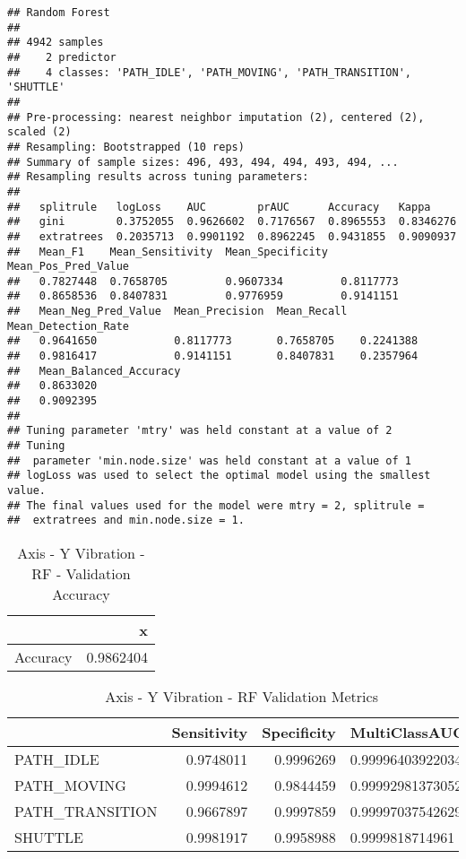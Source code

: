 \documentclass[]{article}
\begin{document}
\begin{verbatim}
## Random Forest 
## 
## 4942 samples
##    2 predictor
##    4 classes: 'PATH_IDLE', 'PATH_MOVING', 'PATH_TRANSITION', 'SHUTTLE' 
## 
## Pre-processing: nearest neighbor imputation (2), centered (2), scaled (2) 
## Resampling: Bootstrapped (10 reps) 
## Summary of sample sizes: 496, 493, 494, 494, 493, 494, ... 
## Resampling results across tuning parameters:
## 
##   splitrule   logLoss    AUC        prAUC      Accuracy   Kappa    
##   gini        0.3752055  0.9626602  0.7176567  0.8965553  0.8346276
##   extratrees  0.2035713  0.9901192  0.8962245  0.9431855  0.9090937
##   Mean_F1    Mean_Sensitivity  Mean_Specificity  Mean_Pos_Pred_Value
##   0.7827448  0.7658705         0.9607334         0.8117773          
##   0.8658536  0.8407831         0.9776959         0.9141151          
##   Mean_Neg_Pred_Value  Mean_Precision  Mean_Recall  Mean_Detection_Rate
##   0.9641650            0.8117773       0.7658705    0.2241388          
##   0.9816417            0.9141151       0.8407831    0.2357964          
##   Mean_Balanced_Accuracy
##   0.8633020             
##   0.9092395             
## 
## Tuning parameter 'mtry' was held constant at a value of 2
## Tuning
##  parameter 'min.node.size' was held constant at a value of 1
## logLoss was used to select the optimal model using the smallest value.
## The final values used for the model were mtry = 2, splitrule =
##  extratrees and min.node.size = 1.
\end{verbatim}

\begin{table}[!h]

\caption{\label{tab:sensor-y-vib-rf-results}Axis - Y Vibration - RF - Validation Accuracy}
\centering
\begin{tabular}[t]{lr}
\toprule
  & x\\
\midrule
Accuracy & 0.9862404\\
\bottomrule
\end{tabular}
\end{table}

\begin{table}[!h]

\caption{\label{tab:sensor-y-vib-rf-results}Axis - Y Vibration - RF Validation Metrics}
\centering
\begin{tabular}[t]{lrrl}
\toprule
  & Sensitivity & Specificity & MultiClassAUC\\
\midrule
PATH\_IDLE & 0.9748011 & 0.9996269 & 0.999964039220344\\
PATH\_MOVING & 0.9994612 & 0.9844459 & 0.999929813730529\\
PATH\_TRANSITION & 0.9667897 & 0.9997859 & 0.999970375426298\\
SHUTTLE & 0.9981917 & 0.9958988 & 0.9999818714961\\
\bottomrule
\end{tabular}
\end{table}
\end{document}
